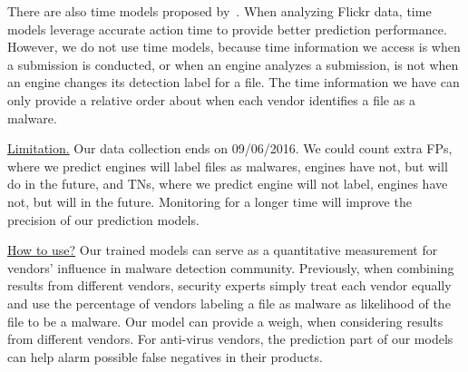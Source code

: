 There are also time models proposed by~\citet{Influence}.
When analyzing Flickr data, time models leverage accurate action time to provide better prediction performance. 
However, we do not use time models, 
because time information we access is when a submission is conducted, 
or when an engine analyzes a submission, 
is not when an engine changes its detection label for a file.
The time information we have can only provide a relative order about when each vendor identifies a file as a malware.  

\underline{Limitation.}
Our data collection ends on 09/06/2016. 
We could count extra FPs, where we predict engines will label files as malwares, engines have not, but will do in the future, 
and TNs, where we predict engine will not label, engines have not, but will in the future. 
Monitoring \vt for a longer time will improve the precision of our prediction models. 

\underline{How to use?}
Our trained models can serve as 
a quantitative measurement for vendors’ influence in malware detection community. 
Previously, when combining results from different vendors, 
security experts simply treat each vendor equally and use the percentage of 
vendors labeling a file as malware as likelihood of the file to be a malware. 
Our model can provide a weigh, when considering results from different vendors.  
For anti-virus vendors, the prediction part of our models can help alarm possible false negatives in their products.
